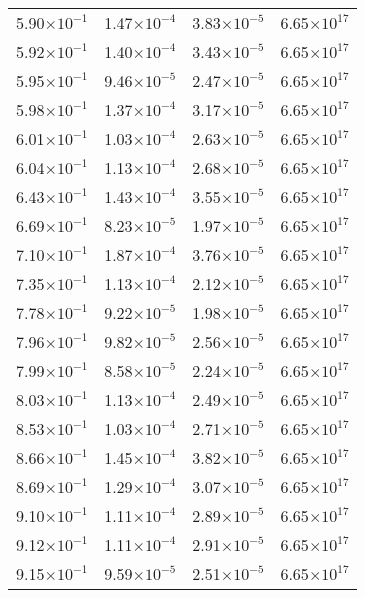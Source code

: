 \documentclass{aa}
\begin{document}
{\begin{longtable}{c|c|c|c}
5.90$\times 10^{-1}$ & 1.47$\times 10^{-4}$ & 3.83$\times 10^{-5}$ & 6.65$\times 10^{17}$  \\
5.92$\times 10^{-1}$ & 1.40$\times 10^{-4}$ & 3.43$\times 10^{-5}$ & 6.65$\times 10^{17}$  \\
5.95$\times 10^{-1}$ & 9.46$\times 10^{-5}$ & 2.47$\times 10^{-5}$ & 6.65$\times 10^{17}$  \\
5.98$\times 10^{-1}$ & 1.37$\times 10^{-4}$ & 3.17$\times 10^{-5}$ & 6.65$\times 10^{17}$  \\
6.01$\times 10^{-1}$ & 1.03$\times 10^{-4}$ & 2.63$\times 10^{-5}$ & 6.65$\times 10^{17}$  \\
6.04$\times 10^{-1}$ & 1.13$\times 10^{-4}$ & 2.68$\times 10^{-5}$ & 6.65$\times 10^{17}$  \\
6.43$\times 10^{-1}$ & 1.43$\times 10^{-4}$ & 3.55$\times 10^{-5}$ & 6.65$\times 10^{17}$  \\
6.69$\times 10^{-1}$ & 8.23$\times 10^{-5}$ & 1.97$\times 10^{-5}$ & 6.65$\times 10^{17}$  \\
7.10$\times 10^{-1}$ & 1.87$\times 10^{-4}$ & 3.76$\times 10^{-5}$ & 6.65$\times 10^{17}$  \\
7.35$\times 10^{-1}$ & 1.13$\times 10^{-4}$ & 2.12$\times 10^{-5}$ & 6.65$\times 10^{17}$  \\
7.78$\times 10^{-1}$ & 9.22$\times 10^{-5}$ & 1.98$\times 10^{-5}$ & 6.65$\times 10^{17}$  \\
7.96$\times 10^{-1}$ & 9.82$\times 10^{-5}$ & 2.56$\times 10^{-5}$ & 6.65$\times 10^{17}$  \\
7.99$\times 10^{-1}$ & 8.58$\times 10^{-5}$ & 2.24$\times 10^{-5}$ & 6.65$\times 10^{17}$  \\
8.03$\times 10^{-1}$ & 1.13$\times 10^{-4}$ & 2.49$\times 10^{-5}$ & 6.65$\times 10^{17}$  \\
8.53$\times 10^{-1}$ & 1.03$\times 10^{-4}$ & 2.71$\times 10^{-5}$ & 6.65$\times 10^{17}$  \\
8.66$\times 10^{-1}$ & 1.45$\times 10^{-4}$ & 3.82$\times 10^{-5}$ & 6.65$\times 10^{17}$  \\
8.69$\times 10^{-1}$ & 1.29$\times 10^{-4}$ & 3.07$\times 10^{-5}$ & 6.65$\times 10^{17}$  \\
9.10$\times 10^{-1}$ & 1.11$\times 10^{-4}$ & 2.89$\times 10^{-5}$ & 6.65$\times 10^{17}$  \\
9.12$\times 10^{-1}$ & 1.11$\times 10^{-4}$ & 2.91$\times 10^{-5}$ & 6.65$\times 10^{17}$  \\
9.15$\times 10^{-1}$ & 9.59$\times 10^{-5}$ & 2.51$\times 10^{-5}$ & 6.65$\times 10^{17}$  \\

\end{longtable}}
\end{document}
